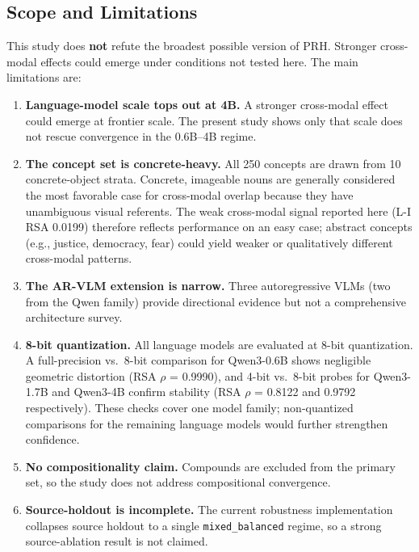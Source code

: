 \documentclass[10pt]{article}
\providecommand{\tightlist}{%
  \setlength{\itemsep}{0pt}\setlength{\parskip}{0pt}}
\begin{document}
\subsection{Scope and Limitations}\label{scope-and-limitations}

This study does \textbf{not} refute the broadest possible version of
PRH. Stronger cross-modal effects could emerge under conditions not
tested here. The main limitations are:

\begin{enumerate}
\def\labelenumi{\arabic{enumi}.}
\tightlist
\item
  \textbf{Language-model scale tops out at 4B.} A stronger cross-modal
  effect could emerge at frontier scale. The present study shows only
  that scale does not rescue convergence in the 0.6B--4B regime.
\item
  \textbf{The concept set is concrete-heavy.} All 250 concepts are drawn
  from 10 concrete-object strata. Concrete, imageable nouns are
  generally considered the most favorable case for cross-modal overlap
  because they have unambiguous visual referents. The weak cross-modal
  signal reported here (L-I RSA 0.0199) therefore reflects performance
  on an easy case; abstract concepts (e.g., justice, democracy, fear)
  could yield weaker or qualitatively different cross-modal patterns.
\item
  \textbf{The AR-VLM extension is narrow.} Three autoregressive VLMs
  (two from the Qwen family) provide directional evidence but not a
  comprehensive architecture survey.
\item
  \textbf{8-bit quantization.} All language models are evaluated at
  8-bit quantization. A full-precision vs.~8-bit comparison for
  Qwen3-0.6B shows negligible geometric distortion (RSA \(\rho\) =
  0.9990), and 4-bit vs.~8-bit probes for Qwen3-1.7B and Qwen3-4B
  confirm stability (RSA \(\rho\) = 0.8122 and 0.9792 respectively).
  These checks cover one model family; non-quantized comparisons for the
  remaining language models would further strengthen confidence.
\item
  \textbf{No compositionality claim.} Compounds are excluded from the
  primary set, so the study does not address compositional convergence.
\item
  \textbf{Source-holdout is incomplete.} The current robustness
  implementation collapses source holdout to a single
  \texttt{mixed\_balanced} regime, so a strong source-ablation result is
  not claimed.
\end{enumerate}
\end{document}
